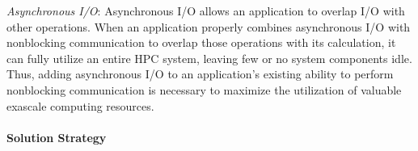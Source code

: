 
\textit{Asynchronous I/O}: Asynchronous I/O allows an application to overlap I/O with other operations. When an application properly combines asynchronous I/O with nonblocking communication to overlap those operations with its calculation, it can fully utilize an entire HPC system, leaving few or no system components idle. Thus, adding asynchronous I/O to an application's existing ability to perform nonblocking communication is necessary to maximize the utilization of valuable exascale computing resources.


\paragraph{Solution Strategy}



